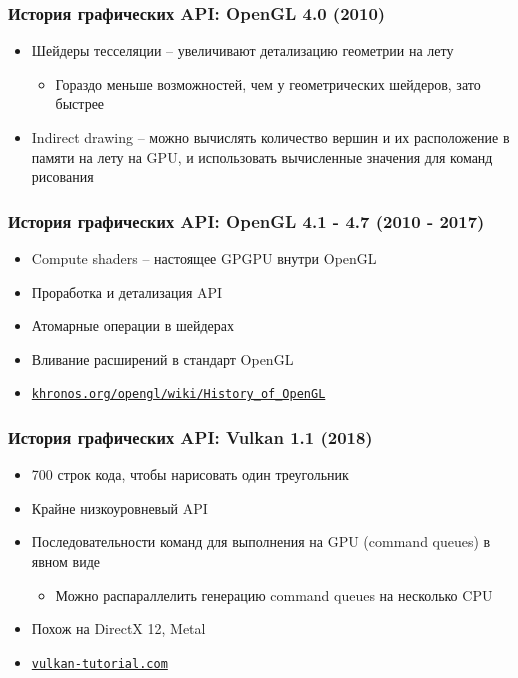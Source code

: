 \documentclass{beamer}
\begin{document}
\begin{frame}
\frametitle{История графических API: OpenGL 4.0 (2010)}
\begin{itemize}
\item Шейдеры тесселяции -- увеличивают детализацию геометрии на лету
\begin{itemize}
\item Гораздо меньше возможностей, чем у геометрических шейдеров, зато быстрее
\end{itemize}
\pause
\item Indirect drawing -- можно вычислять количество вершин и их расположение в памяти на лету на GPU, и использовать вычисленные значения для команд рисования
\end{itemize}
\end{frame}

\begin{frame}
\frametitle{История графических API: OpenGL 4.1 - 4.7 (2010 - 2017)}
\begin{itemize}
\item Compute shaders -- настоящее GPGPU внутри OpenGL
\item Проработка и детализация API
\item Атомарные операции в шейдерах
\item Вливание расширений в стандарт OpenGL
\item \href{https://khronos.org/opengl/wiki/History_of_OpenGL}{\nolinkurl{khronos.org/opengl/wiki/History\_of\_OpenGL}}
\end{itemize}
\end{frame}

\begin{frame}
\frametitle{История графических API: Vulkan 1.1 (2018)}
\begin{itemize}
\item 700 строк кода, чтобы нарисовать один треугольник
\pause
\item Крайне низкоуровневый API
\item Последовательности команд для выполнения на GPU (command queues) в явном виде
\begin{itemize}
\item Можно распараллелить генерацию command queues на несколько CPU
\end{itemize}
\pause
\item Похож на DirectX 12, Metal
\item \href{https://vulkan-tutorial.com}{\nolinkurl{vulkan-tutorial.com}}
\end{itemize}
\end{frame}
\end{document}
